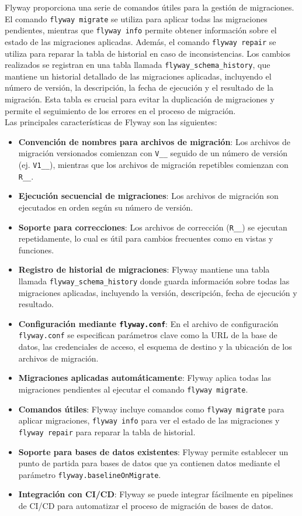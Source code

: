 \documentclass{IEEEtran}
\begin{document}
Flyway proporciona una serie de comandos útiles para la gestión de migraciones. El comando \texttt{flyway migrate} se utiliza para aplicar todas las migraciones pendientes, mientras que \texttt{flyway info} permite obtener información sobre el estado de las migraciones aplicadas. Además, el comando \texttt{flyway repair} se utiliza para reparar la tabla de historial en caso de inconsistencias. Los cambios realizados se registran en una tabla llamada \texttt{flyway\_schema\_history}, que mantiene un historial detallado de las migraciones aplicadas, incluyendo el número de versión, la descripción, la fecha de ejecución y el resultado de la migración. Esta tabla es crucial para evitar la duplicación de migraciones y permite el seguimiento de los errores en el proceso de migración. \\

Las principales características de Flyway son las siguientes:

\begin{itemize}
    \item \textbf{Convención de nombres para archivos de migración}: Los archivos de migración versionados comienzan con \texttt{V\_\_} seguido de un número de versión (ej. \texttt{V1\_\_}), mientras que los archivos de migración repetibles comienzan con \texttt{R\_\_}.
    \item \textbf{Ejecución secuencial de migraciones}: Los archivos de migración son ejecutados en orden según su número de versión.
    \item \textbf{Soporte para correcciones}: Los archivos de corrección (\texttt{R\_\_}) se ejecutan repetidamente, lo cual es útil para cambios frecuentes como en vistas y funciones.
    \item \textbf{Registro de historial de migraciones}: Flyway mantiene una tabla llamada \texttt{flyway\_schema\_history} donde guarda información sobre todas las migraciones aplicadas, incluyendo la versión, descripción, fecha de ejecución y resultado.
    \item \textbf{Configuración mediante \texttt{flyway.conf}}: En el archivo de configuración \texttt{flyway.conf} se especifican parámetros clave como la URL de la base de datos, las credenciales de acceso, el esquema de destino y la ubicación de los archivos de migración.
    \item \textbf{Migraciones aplicadas automáticamente}: Flyway aplica todas las migraciones pendientes al ejecutar el comando \texttt{flyway migrate}.
    \item \textbf{Comandos útiles}: Flyway incluye comandos como \texttt{flyway migrate} para aplicar migraciones, \texttt{flyway info} para ver el estado de las migraciones y \texttt{flyway repair} para reparar la tabla de historial.
    \item \textbf{Soporte para bases de datos existentes}: Flyway permite establecer un punto de partida para bases de datos que ya contienen datos mediante el parámetro \texttt{flyway.baselineOnMigrate}.
    \item \textbf{Integración con CI/CD}: Flyway se puede integrar fácilmente en pipelines de CI/CD para automatizar el proceso de migración de bases de datos.
\end{itemize}
\end{document}
